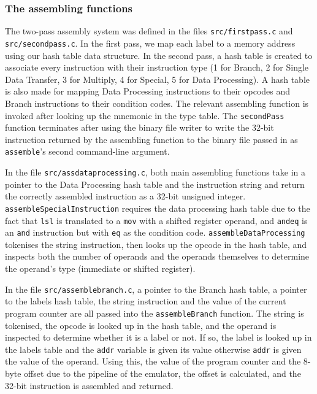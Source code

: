 \documentclass[11pt]{article}
\begin{document}
\subsubsection{The assembling functions}
The two-pass assembly system was defined in the files \texttt{src/firstpass.c} and \texttt{src/secondpass.c}. In the first pass, we map each label to a memory address using our hash table data structure. In the second pass, a hash table is created to associate every instruction with their instruction type (1 for Branch, 2 for Single Data Transfer, 3 for Multiply, 4 for Special, 5 for Data Processing). A hash table is also made for mapping Data Processing instructions to their opcodes and Branch instructions to their condition codes. The relevant assembling function is invoked after looking up the mnemonic in the type table. The \texttt{secondPass} function terminates after using the binary file writer to write the 32-bit instruction returned by the assembling function to the binary file passed in as \texttt{assemble}'s second command-line argument.
\par
In the file \texttt{src/assdataprocessing.c}, both main assembling functions take in a pointer to the Data Processing hash table and the instruction string and return the correctly assembled instruction as a 32-bit unsigned integer. \texttt{assembleSpecialInstruction} requires the data processing hash table due to the fact that \texttt{lsl} is translated to a \texttt{mov} with a shifted register operand, and \texttt{andeq} is an \texttt{and} instruction but with \texttt{eq} as the condition code. \texttt{assembleDataProcessing} tokenises the string instruction, then looks up the opcode in the hash table, and inspects both the number of operands and the operands themselves to determine the operand's type (immediate or shifted register).
\par
In the file \texttt{src/assemblebranch.c}, a pointer to the Branch hash table, a pointer to the labels hash table, the string instruction and the value of the current program counter are all passed into the \texttt{assembleBranch} function. The string is tokenised, the opcode is looked up in the hash table, and the operand is inspected to determine whether it is a label or not. If so, the label is looked up in the labels table and the \texttt{addr} variable is given its value otherwise \texttt{addr} is given the value of the operand. Using this, the value of the program counter and the 8-byte offset due to the pipeline of the emulator, the offset is calculated, and the 32-bit instruction is assembled and returned.
\end{document}
